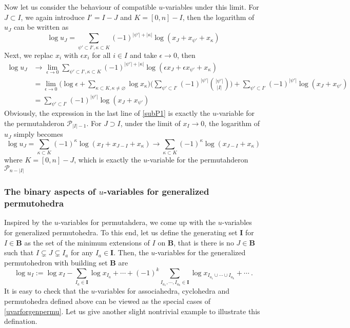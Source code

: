 \documentclass[hidelinks,12pt]{article}
\begin{document}
\begin{enumerate}
Now let us consider the behaviour of compatible $u$-variables under this limit. For $J\subset I$, we again introduce $I'=I-J$ and $K=[0,n]-I$, then the logarithm of $u_{J}$ can be written as 
\begin{equation}
     \log u_{J}=\sum_{\psi'\subset I', \kappa \subset K} (-1)^{\lvert \psi'\rvert +\lvert \kappa \rvert} \log (x_{J}+x_{\psi'}+x_{\kappa})
\end{equation}
Next, we replac $x_{i}$ with $ \epsilon x_{i}$ for all $i\in I$ and take $\epsilon \to 0$, then 
\begin{align}
   \log u_{J} &\to \lim_{\epsilon \to 0} \sum_{\psi'\subset I', \kappa \subset K} (-1)^{\lvert \psi'\rvert +\lvert \kappa \rvert} \log (\epsilon x_{J}+ \epsilon x_{\psi'}+x_{\kappa}) \nonumber  \\
    &=\lim_{\epsilon\to 0} \biggl(\log \epsilon+\sum_{\kappa\subset K,\kappa \neq \varnothing}\log x_{\kappa}\biggr)\Biggr( \sum_{\psi'\subset I'}(-1)^{\lvert\psi'\rvert}\binom{\lvert \psi' \rvert }{\lvert I \rvert }\Biggr)
    +\sum_{\psi'\subset I'} (-1)^{\lvert \psi'\rvert }\log (x_{J}+x_{\psi'}) \nonumber \\
    &=\sum_{\psi'\subset I'} (-1)^{\lvert \psi'\rvert }\log (x_{J}+x_{\psi'}) \label{subP1}
\end{align}
Obviously, the expression in the last line of \eqref{subP1} is exactly the $u$-variable for the permutahderon $\mathscr{P}_{\lvert I\rvert -1}$. For $J\supset I$, under the limit of $x_I\to 0$, the logarithm of $u_{J}$ simply becomes 
\begin{equation}
   \log u_{J} = \sum_{\kappa \subset K} (-1)^{\kappa} \log (x_{I}+x_{J-I}+x_{\kappa}) 
   \to  \sum_{\kappa \subset K} (-1)^{\kappa} \log (x_{J-I}+x_{\kappa}) 
\end{equation}
where $K=[0,n]-J$, which is exactly the $u$-variable for the permutahderon $\mathscr{P}_{n-\lvert I\rvert}$


\subsubsection{The binary aspects of $u$-variables for generalized permutohedra}

Inspired by the $u$-variables for permutahdera, we come up with the $u$-variables for generalized permutohedra. To this end, let us define the generating set $\mathbf{I}$ for $I\in\mathbf{B}$ as the set of the minimum extensions of $I$ on $\mathbf{B}$, that is there is no $J\in\mathbf{B}$ such that $I\subsetneq J\subsetneq I_{a}$ for any $I_{a}\in \mathbf{I}$. Then, the $u$-variables for the generalized permutohedron with building set $\mathbf{B}$ are 
\begin{equation}
   \log u_{I} :=  \log x_{I}- \sum_{I_{a}\in \mathbf{I}} \log x_{I_{a}}+\cdots +(-1)^{k}\sum _{I_{a_{1}},\cdots,I_{a_{k}}\in \mathbf{I}} \log x_{I_{a_{1}}\cup\cdots \cup I_{a_{k}}} +\cdots \:. \label{uvarforgenpermu}
\end{equation}
It is easy to check that the $u$-variables for associahedra, cyclohedra and permutohedra defined above can be viewed as the special cases of \eqref{uvarforgenpermu}. Let us give another slight nontrivial example to illustrate this defination.


\end{enumerate}
\end{document}
